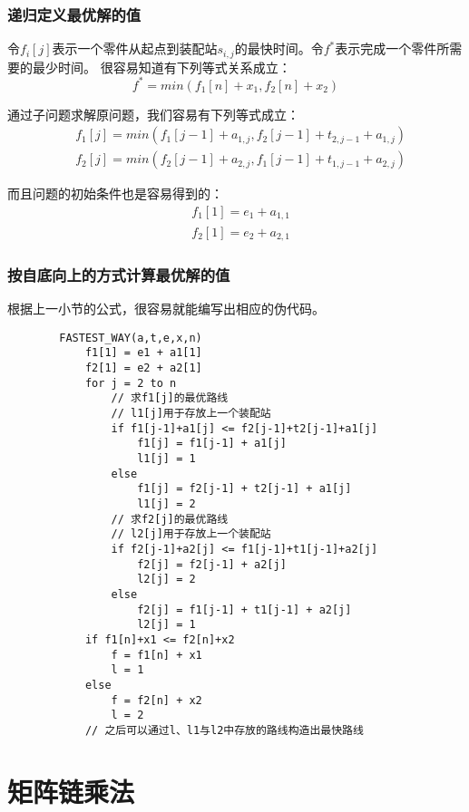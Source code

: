 \documentclass[a4paper,left=2.5cm,right=2.5cm,11pt]{article}
\begin{document}
\subsubsection{递归定义最优解的值}
	令$f_i[j]$表示一个零件从起点到装配站$s_{i,j}$的最快时间。令$f^*$表示完成一个零件所需要的最少时间。
	很容易知道有下列等式关系成立：
	\begin{equation}
		f^* = min(f_1[n]+x_1,f_2[n]+x_2)
	\end{equation}

	通过子问题求解原问题，我们容易有下列等式成立：
	\begin{equation}
	\begin{split}
		&f_1[j] = min(f_1[j-1]+a_{1,j},f_2[j-1]+t_{2,j-1}+a_{1,j})\\ 
		&f_2[j] = min(f_2[j-1]+a_{2,j},f_1[j-1]+t_{1,j-1}+a_{2,j})
	\end{split}
	\end{equation}

	而且问题的初始条件也是容易得到的：
	\begin{equation}
		\begin{split}
			& f_1[1] = e_1 + a_{1,1}\\
			& f_2[1] = e_2 + a_{2,1}
		\end{split}
	\end{equation}

\subsubsection{按自底向上的方式计算最优解的值}
	根据上一小节的公式，很容易就能编写出相应的伪代码。
	\begin{lstlisting}
		FASTEST_WAY(a,t,e,x,n)
			f1[1] = e1 + a1[1]
			f2[1] = e2 + a2[1]
			for j = 2 to n
				// 求f1[j]的最优路线
				// l1[j]用于存放上一个装配站
				if f1[j-1]+a1[j] <= f2[j-1]+t2[j-1]+a1[j]
					f1[j] = f1[j-1] + a1[j]
					l1[j] = 1
				else
					f1[j] = f2[j-1] + t2[j-1] + a1[j]
					l1[j] = 2
				// 求f2[j]的最优路线
				// l2[j]用于存放上一个装配站
				if f2[j-1]+a2[j] <= f1[j-1]+t1[j-1]+a2[j]
					f2[j] = f2[j-1] + a2[j]
					l2[j] = 2
				else
					f2[j] = f1[j-1] + t1[j-1] + a2[j]
					l2[j] = 1 
			if f1[n]+x1 <= f2[n]+x2
				f = f1[n] + x1
				l = 1
			else
				f = f2[n] + x2
				l = 2
			// 之后可以通过l、l1与l2中存放的路线构造出最快路线
	\end{lstlisting}

\section{矩阵链乘法}
\end{document}
